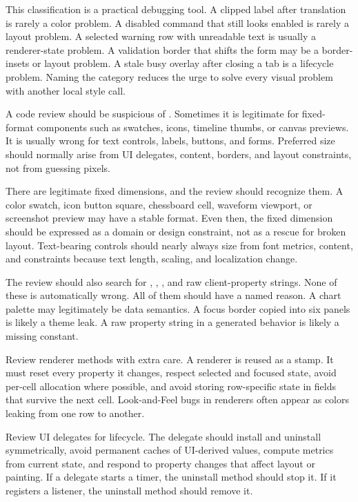 This classification is a practical debugging tool. A clipped label after translation is rarely a color problem. A disabled command that still looks enabled is rarely a layout problem. A selected warning row with unreadable text is usually a renderer-state problem. A validation border that shifts the form may be a border-insets or layout problem. A stale busy overlay after closing a tab is a lifecycle problem. Naming the category reduces the urge to solve every visual problem with another local style call.

A code review should be suspicious of . Sometimes it is legitimate for fixed-format components such as swatches, icons, timeline thumbs, or canvas previews. It is usually wrong for text controls, labels, buttons, and forms. Preferred size should normally arise from UI delegates, content, borders, and layout constraints, not from guessing pixels.

There are legitimate fixed dimensions, and the review should recognize them. A color swatch, icon button square, chessboard cell, waveform viewport, or screenshot preview may have a stable format. Even then, the fixed dimension should be expressed as a domain or design constraint, not as a rescue for broken layout. Text-bearing controls should nearly always size from font metrics, content, and constraints because text length, scaling, and localization change.

The review should also search for , , , and raw client-property strings. None of these is automatically wrong. All of them should have a named reason. A chart palette may legitimately be data semantics. A focus border copied into six panels is likely a theme leak. A raw property string in a generated behavior is likely a missing constant.

Review renderer methods with extra care. A renderer is reused as a stamp. It must reset every property it changes, respect selected and focused state, avoid per-cell allocation where possible, and avoid storing row-specific state in fields that survive the next cell. Look-and-Feel bugs in renderers often appear as colors leaking from one row to another.

Review UI delegates for lifecycle. The delegate should install and uninstall symmetrically, avoid permanent caches of UI-derived values, compute metrics from current state, and respond to property changes that affect layout or painting. If a delegate starts a timer, the uninstall method should stop it. If it registers a listener, the uninstall method should remove it.


